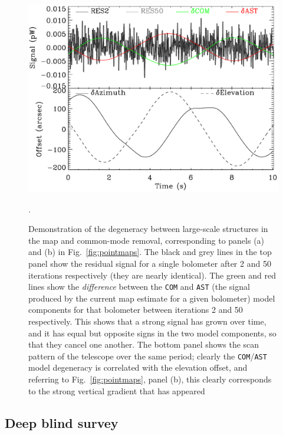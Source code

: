 \documentclass[useAMS,usenatbib,nofootinbib]{mn2e}
\newcommand{\model}[1]{\texttt{#1}}
\begin{document}
\begin{figure}
\centering
\includegraphics[width=\linewidth]{degeneracy.pdf}
\caption{Demonstration of the degeneracy between large-scale
  structures in the map and common-mode removal, corresponding to
  panels (a) and (b) in Fig.~\ref{fig:pointmaps}. The black and grey
  lines in the top panel show the residual signal for a single
  bolometer after 2 and 50 iterations respectively (they are nearly
  identical). The green and red lines show the \emph{difference}
  between the \model{COM} and \model{AST} (the signal produced by the
  current map estimate for a given bolometer) model components for
  that bolometer between iterations 2 and 50 respectively. This shows
  that a strong signal has grown over time, and it has equal but
  opposite signs in the two model components, so that they cancel one
  another. The bottom panel shows the scan pattern of the telescope
  over the same period; clearly the \model{COM}/\model{AST} model
  degeneracy is correlated with the elevation offset, and referring to
  Fig.~\ref{fig:pointmaps}, panel (b), this clearly corresponds to the
  strong vertical gradient that has appeared}.
\label{fig:degeneracy}
\end{figure}

\subsection{Deep blind survey}
\label{sec:cosmo}
\end{document}
